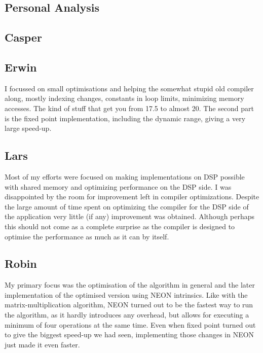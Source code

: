 \documentclass[final]{article} %
\begin{document}
\begin{appendices}

\section{Personal Analysis}\label{app:appendix-personal-analysis}

\subsection{Casper}


\subsection{Erwin}
I focussed on small optimisations and helping the somewhat stupid old compiler along, mostly indexing changes, constants in loop limits, minimizing memory accesses.
The kind of stuff that get you from \SI{17.5}{\speedup} to almost \SI{20}{\speedup}.
The second part is the fixed point implementation, including the dynamic range, giving a very large speed-up.

\subsection{Lars}
Most of my efforts were focused on making implementations on DSP possible with shared memory and optimizing performance on the DSP side.
I was disappointed by the room for improvement left in compiler optimizations.
Despite the large amount of time spent on optimizing the compiler for the DSP side of the application very little (if any) improvement was obtained.
Although perhaps this should not come as a complete surprise as the compiler is designed to optimise the performance as much as it can by itself.

\subsection{Robin}
My primary focus was the optimisation of the algorithm in general and the later implementation of the optimised version using NEON intrinsics.
Like with the matrix-multiplication algorithm, NEON turned out to be the fastest way to run the algorithm, as it hardly introduces any overhead, but allows for executing a minimum of four operations at the same time.
Even when fixed point turned out to give the biggest speed-up we had seen, implementing those changes in NEON just made it even faster.


\end{appendices}
\end{document}
